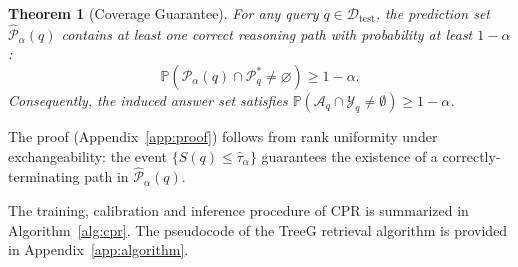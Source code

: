 \documentclass{article}
\theoremstyle{plain}
\newtheorem{theorem}{Theorem}[section]
\theoremstyle{definition}
\theoremstyle{remark}
\begin{document}
\begin{theorem}[Coverage Guarantee]
\label{thm:qecp}
For any query $q \in \mathcal{D}_{\text{test}}$, the prediction set $\widehat{\mathcal{P}}_\alpha(q)$ contains at least one correct reasoning path with probability at least $1 - \alpha$:
\begin{equation}
\mathbb{P}\!\left(\widehat{\mathcal{P}}_\alpha(q) \cap \mathcal{P}^*_{q} \neq \varnothing\right) \ge 1 - \alpha.
\end{equation}
Consequently, the induced answer set satisfies $\mathbb{P}\!\left(\mathcal{A}_{q} \cap \mathcal{Y}_{q} \neq \emptyset\right) \ge 1 - \alpha$.
\end{theorem}
\noindent The proof (Appendix~\ref{app:proof}) follows from rank uniformity under exchangeability: the event $\{S(q) \le \hat{\tau}_\alpha\}$ guarantees the existence of a correctly-terminating path in $\widehat{\mathcal{P}}_\alpha(q)$.

The training, calibration and inference procedure of CPR is summarized in Algorithm~\ref{alg:cpr}. The pseudocode of the TreeG retrieval algorithm is provided in Appendix~\ref{app:algorithm}.
\end{document}
